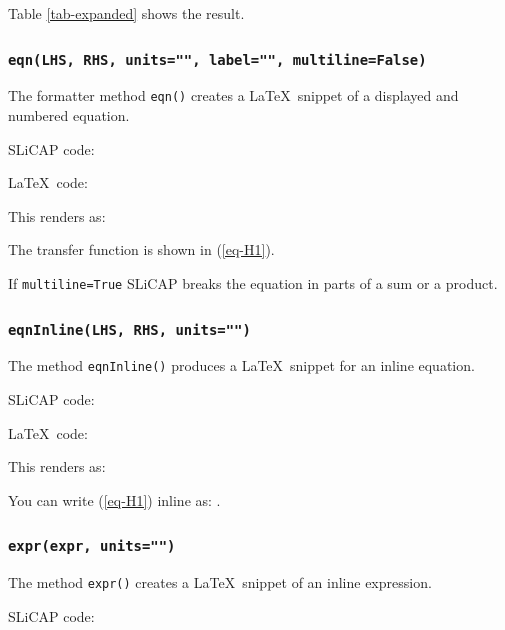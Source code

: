 \documentclass[a4paper,12pt]{article}
\begin{document}
Table \ref{tab-expanded} shows the result.



\subsubsection{\texttt{eqn(LHS, RHS, units="", label="", multiline=False)}}

The formatter method {\texttt{eqn()}} creates a \LaTeX$\,$ snippet of a displayed and numbered equation.

SLiCAP code:



\LaTeX$\,$ code:



This renders as:

The transfer function is shown in (\ref{eq-H1}).


If {\texttt{multiline=True}} SLiCAP breaks the equation in parts of a sum or a product.

\subsubsection{\texttt{eqnInline(LHS, RHS, units="")}}

The method {\texttt{eqnInline()}} produces a \LaTeX$\,$ snippet for an inline equation.

SLiCAP code:



\LaTeX$\,$ code:



This renders as:

You can write (\ref{eq-H1}) inline as:
.

\subsubsection{\texttt{expr(expr, units="")}}

The method {\texttt{expr()}} creates a \LaTeX$\,$ snippet of an inline expression.

SLiCAP code:
\end{document}
